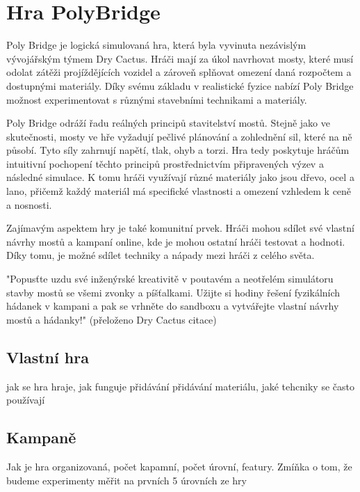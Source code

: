 \chapter{Hra PolyBridge}

Poly Bridge je logická simulovaná hra, která byla vyvinuta nezávislým vývojářským týmem Dry Cactus. Hráči mají za úkol navrhovat mosty, které musí odolat zátěži projíždějících vozidel a zároveň splňovat omezení daná rozpočtem a dostupnými materiály. Díky svému základu v realistické fyzice nabízí Poly Bridge možnost experimentovat s různými stavebními technikami a materiály.

Poly Bridge odráží řadu reálných principů stavitelství mostů. Stejně jako ve skutečnosti, mosty ve hře vyžadují pečlivé plánování a zohlednění sil, které na ně působí. Tyto síly zahrnují napětí, tlak, ohyb a torzi. Hra tedy poskytuje hráčům intuitivní pochopení těchto principů prostřednictvím připravených výzev a následné simulace. K tomu hráči využívají různé materiály jako jsou dřevo, ocel a lano, přičemž každý materiál má specifické vlastnosti a omezení vzhledem k ceně a nosnosti.

Zajímavým aspektem hry je také komunitní prvek. Hráči mohou sdílet své vlastní návrhy mostů a kampaní online, kde je mohou ostatní hráči testovat a hodnoti. Díky tomu, je možné sdílet techniky a nápady mezi hráči z celého světa. 

"Popusťte uzdu své inženýrské kreativitě v poutavém a neotřelém simulátoru stavby mostů se všemi zvonky a píšťalkami. Užijte si hodiny řešení fyzikálních hádanek v kampani a pak se vrhněte do sandboxu a vytvářejte vlastní návrhy mostů a hádanky!" (přeloženo Dry Cactus citace)

\section{Vlastní hra}

jak se hra hraje, jak funguje přidávání přidávání materiálu, jaké tehcniky se často používají

\section{Kampaně}

Jak je hra organizovaná, počet kapamní, počet úrovní, featury.
Zmíňka o tom, že budeme experimenty měřit na prvních 5 úrovních ze hry
